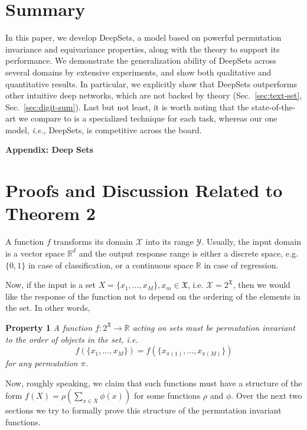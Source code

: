 \documentclass{article}
\newcommand{\refsec}[1]{Sec.~\ref{#1}}
\newcommand{\latinphrase}[1]{\emph{#1}}    %
\newcommand{\ie}{\latinphrase{i.e.}\xspace}
\newcommand{\deepsets}{DeepSets\xspace}
\begin{document}
\section{Summary}
\label{sec:summary}
In this paper, we develop \deepsets, a model based on powerful permutation invariance and equivariance properties, along with the theory to support its performance.
We demonstrate the generalization ability of \deepsets across several domains by extensive experiments, and show both qualitative and quantitative results.
In particular, we explicitly show that \deepsets outperforms other intuitive deep networks, which are not backed by theory (\refsec{sec:text-set}, \refsec{sec:digit-sum}).
Last but not least, it is worth noting that the state-of-the-art we compare to is a specialized technique for each task, whereas our one model, \ie, \deepsets, is competitive across the board.




\newpage
\appendix
\onecolumn
\begin{center}
\bfseries\large
Appendix: Deep Sets
\end{center}
\section{Proofs and Discussion Related to Theorem 2}
\label{app:proofs}

A function $f$ transforms its domain $\mathcal{X}$ into its range $\mathcal{Y}$. Usually, the input domain is a vector space $\mathbb{R}^d$ and the output response range is either a discrete space, e.g. $\{0,1\}$ in case of classification, or a continuous space $\mathbb{R}$ in case of regression.

Now, if the input is a set $X=\{x_1,\ldots,x_M\}, x_m\in \mathfrak{X}$, i.e. $\mathcal{X}=2^\mathfrak{X}$, then we would like the response of the function not to depend on the ordering of the elements in the set.  In other words,


\textbf{Property 1} {\em 
\; A function $f:2^\mathfrak{X}\to\mathbb{R}$ acting on sets must be permutation invariant to the order of objects in the set, i.e.
\begin{equation}
f(\{x_1,...,x_M\}) = f(\{x_{\pi(1)},...,x_{\pi(M)}\})
\end{equation}
for any permutation $\pi$.
}

Now, roughly speaking, we claim that such functions must have a structure of the form $f(X)=\rho\left( \sum_{x \in X} \phi(x)\right)$ for some functions $\rho$ and $\phi$. Over the next two sections we try to formally prove this structure of the permutation invariant functions.
\end{document}
